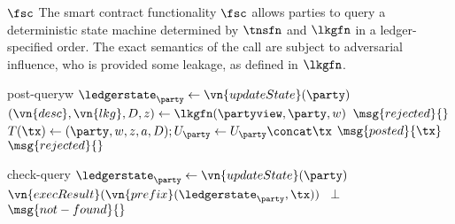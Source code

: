 \begin{functionality}{$\fsc$}
  The smart contract functionality $\fsc$ allows parties to query a
  deterministic state machine determined by $\tnsfn$ and $\lkgfn$ in a
  ledger-specified order. The exact semantics of the call are subject to
  adversarial influence, who is provided some leakage, as defined in $\lkgfn$.
  
  \begin{statedecl}
  \end{statedecl}

  \begin{receive}[honest]{post-query}{w}
    \State \Let $\ledgerstate_\party \gets \vn{updateState}(\party)$
    \State \Let $(\vn{desc}, \vn{lkg}, D, z) \gets \lkgfn(\partyview, \party, w)$
      \State \Return $\msg{rejected}{}$
    \EndIf
    \State  {}
      \State \Let $T(\tx) \gets (\party, w, z, a, D);
        U_\party \gets U_\party \concat \tx$
      \State {}
      \State \Return $\msg{posted}{\tx}$
    \Else
      \State \Return $\msg{rejected}{}$
    \EndIf
  \end{receive}

  \begin{receive}[honest]{check-query}{\tx}
    \State \Let $\ledgerstate_\party \gets \vn{updateState}(\party)$
    \If{$\tx \in \ledgerstate_\party$}
        \State \Return $\vn{execResult}(\vn{prefix}(\ledgerstate_\party, \tx))$
      \Else
        ~\Return $\bot$
      \EndIf
    \Else
      ~\Return $\msg{not-found}{}$
    \EndIf
  \end{receive}


\end{functionality}
